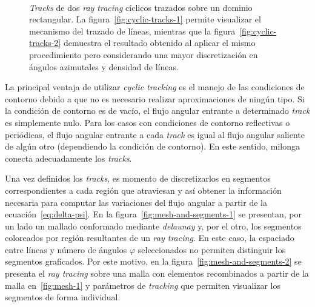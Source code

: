 \documentclass[11pt]{article}
\numberwithin{equation}{section}
\begin{document}
\begin{figure}[!h]
 \begin{center}
  \\
  \caption{\emph{Tracks} de dos \emph{ray tracing} cíclicos trazados sobre un dominio rectangular. La figura~\ref{fig:cyclic-tracks-1} permite visualizar el mecanismo del trazado de líneas, mientras que la figura~\ref{fig:cyclic-tracks-2} demuestra el resultado obtenido al aplicar el mismo procedimiento pero considerando una mayor discretización en ángulos azimutales y densidad de líneas.}
  \label{fig:cyclic-tracks}
 \end{center}
\end{figure}

La principal ventaja de utilizar \emph{cyclic tracking} es el manejo de las condiciones de contorno debido a que no es necesario realizar aproximaciones de ningún tipo. Si la condición de contorno es de vacío, el flujo angular entrante a determinado \emph{track} es simplemente nulo. Para los casos con condiciones de contorno reflectivas o periódicas, el flujo angular entrante a cada \emph{track} es igual al flujo angular saliente de algún otro (dependiendo la condición de contorno). En este sentido, milonga conecta adecuadamente los \emph{tracks}.

Una vez definidos los \emph{tracks}, es momento de discretizarlos en segmentos correspondientes a cada región que atraviesan y así obtener la información necesaria para computar las variaciones del flujo angular a partir de la ecuación~\eqref{eq:delta-psi}. En la figura~\ref{fig:mesh-and-segments-1} se presentan, por un lado un mallado conformado mediante \emph{delaunay} y, por el otro, los segmentos coloreados por región resultantes de un \emph{ray tracing}. En este caso, la espaciado entre líneas y número de ángulos $\varphi$ seleccionados no permiten distinguir los segmentos graficados. Por este motivo, en la figura~\ref{fig:mesh-and-segments-2} se presenta el \emph{ray tracing} sobre una malla con elementos recombinados a partir de la malla en~\ref{fig:mesh-1} y parámetros de \emph{tracking} que permiten visualizar los segmentos de forma individual.
\end{document}
